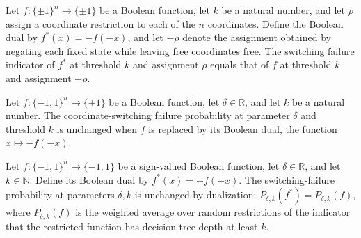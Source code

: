 \begin{theorem}
\label{FABL.coordSwitchingFailureIndicator_booleanDual}
\leanok
{}
Let $f:\{\pm1\}^n\to\{\pm1\}$ be a Boolean function, let $k$ be a natural number, and
let $\rho$ assign a coordinate restriction to each of the $n$ coordinates. Define the
Boolean dual by $f^{*}(x)=-f(-x)$, and let $-\rho$ denote the assignment obtained by
negating each fixed state while leaving free coordinates free. The switching failure
indicator of $f^{*}$ at threshold $k$ and assignment $\rho$ equals that of $f$ at
threshold $k$ and assignment $-\rho$.
\end{theorem}

\begin{theorem}
\label{FABL.coordSwitchingFailureProbability_booleanDual}
\leanok
{}
Let $f:\{-1,1\}^n\to\{\pm1\}$ be a Boolean function, let $\delta\in\mathbb R$,
and let $k$ be a natural number. The coordinate-switching failure probability at
parameter $\delta$ and threshold $k$ is unchanged when $f$ is replaced by its Boolean
dual, the function $x\mapsto -f(-x)$.
\end{theorem}

\begin{theorem}
\label{FABL.switchingFailureProbability_booleanDual}
\leanok
{}
Let $f:\{-1,1\}^n\to\{-1,1\}$ be a sign-valued Boolean function, let
$\delta\in\mathbb R$, and let $k\in\mathbb N$. Define its Boolean dual by
$f^*(x)=-f(-x)$. The switching-failure probability at parameters $\delta,k$ is
unchanged by dualization: $P_{\delta,k}(f^*)=P_{\delta,k}(f)$, where
$P_{\delta,k}(f)$ is the weighted average over random restrictions of the indicator
that the restricted function has decision-tree depth at least $k$.
\end{theorem}

